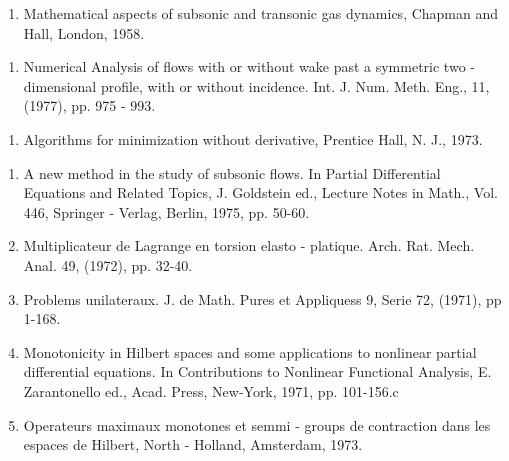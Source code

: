 \begin{thebibliography}{99}
\pageoriginale

  \begin{enumerate}
  \item Mathematical aspects of subsonic and transonic gas dynamics,
 Chapman and Hall, London, 1958.\label{k11:e1} 
  \end{enumerate}


  \begin{enumerate}
  \item Numerical Analysis of flows with or without wake past a
 symmetric two - dimensional profile, with or without
 incidence. Int. J. Num. Meth. Eng., 11, (1977), pp. 975 - 993.\label{k12:e1} 
  \end{enumerate}


  \begin{enumerate}
  \item  Algorithms for minimization without derivative, Prentice
 Hall, N. J., 1973.\label{k13:e1}
  \end{enumerate}


  \begin{enumerate}
  \item  A new method in the study of subsonic flows. In Partial
 Differential Equations and Related Topics, J. Goldstein ed.,
 Lecture Notes in Math., Vol. 446, Springer - Verlag, Berlin, 1975,
 pp. 50-60.\label{k14:e1} 

  \item Multiplicateur de Lagrange en torsion elasto -
  platique. Arch. Rat. Mech. Anal. 49, (1972), pp. 32-40.\label{k14:e2} 

  \item  Problems unilateraux. J. de Math. Pures et Appliquess 9, Serie
  72, (1971), pp 1-168.\label{k14:e3} 

 \item Monotonicity in Hilbert spaces and some applications to
nonlinear partial differential equations. In Contributions to
Nonlinear Functional Analysis, E. Zarantonello ed., Acad. Press,
New-York, 1971, pp. 101-156.c\label{k14:e4} 

 \item Operateurs maximaux monotones et semmi - groups de contraction
  dans les espaces de Hilbert, North - Holland, Amsterdam, 1973.\label{k14:e5} 
  \end{enumerate}


\end{thebibliography}
